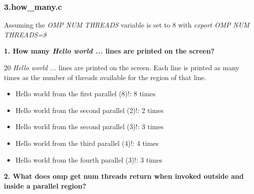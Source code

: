 \documentclass[12]{article}
\begin{document}
\subsubsection{3.how\_many.c}
Assuming the \textit{OMP NUM THREADS} variable is set to 8 with \textit{export OMP NUM THREADS=8}

\textbf{1. How many \textit{Hello world ...} lines are printed on the screen?}

20 \textit{Hello world ...} lines are printed on the screen. Each line is printed as many times as the number of threads available for the region of that line.

\begin{itemize}
    \item Hello world from the first parallel (8)!: 8 times
    \item Hello world from the second parallel (2)!: 2 times
    \item Hello world from the second parallel (3)!: 3 times
    \item Hello world from the third parallel (4)!: 4 times
    \item Hello world from the fourth parallel (3)!: 3 times 
\end{itemize}

\textbf{2. What does omp get num threads return when invoked outside and inside a parallel region?}
\end{document}
